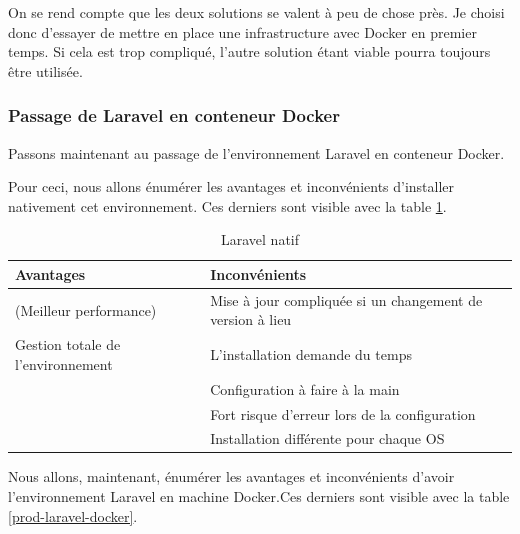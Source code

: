 \documentclass[
    iai, %
    il, %
]{heig-tb}
\begin{document}
On se rend compte que les deux solutions se valent à peu de chose près. Je choisi donc d'essayer de mettre en place une infrastructure avec Docker en premier temps. Si cela est trop compliqué, l'autre solution étant viable pourra toujours être utilisée.

\subsubsection{Passage de Laravel en conteneur Docker}
Passons maintenant au passage de l'environnement Laravel en conteneur Docker.

Pour ceci, nous allons énumérer les avantages et inconvénients d'installer nativement cet
environnement. Ces derniers sont visible avec la table \ref{prod-laravel-native}.

\begin{table}[h]
    \begin{center}
        \caption{Laravel natif \label{prod-laravel-native}}
        \begin{tabularx}{1.0\textwidth} {X|X}
            Avantages                         & Inconvénients                                             \\ \hline
            (Meilleur performance)            & Mise à jour compliquée si un changement de version à lieu \\
            Gestion totale de l'environnement & L'installation demande du temps                           \\
                                              & Configuration à faire à la main                           \\
                                              & Fort risque d'erreur lors de la configuration             \\
                                              & Installation différente pour chaque OS                    \\
        \end{tabularx}
    \end{center}
\end{table}

Nous allons, maintenant, énumérer les avantages et inconvénients d'avoir l'environnement Laravel
en machine Docker.Ces derniers sont visible avec la table \ref{prod-laravel-docker}.
\end{document}
